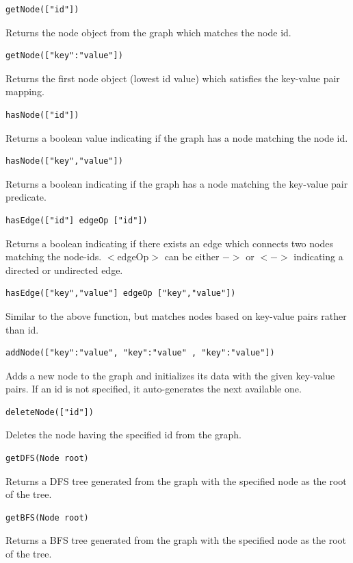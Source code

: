 \documentclass[a4paper]{article}
\begin{document}
\begin{verbatim}getNode(["id"])\end{verbatim} Returns the node object from the graph which matches the node id.
\newline
\begin{verbatim}getNode(["key":"value"])\end{verbatim} Returns the first node object (lowest id value) which satisfies the key-value pair mapping.
\newline
\begin{verbatim}hasNode(["id"])\end{verbatim} Returns a boolean value indicating if the graph has a node matching the node id.
\newline
\begin{verbatim}hasNode(["key","value"])\end{verbatim} Returns a boolean indicating if the graph has a node matching the key-value pair predicate.
\newline
\begin{verbatim}hasEdge(["id"] edgeOp ["id"])\end{verbatim} Returns a boolean indicating if there exists an edge which connects two nodes matching the node-ids. $<$edgeOp$>$ can be either $->$ or $<->$ indicating a directed or undirected edge.
\newline
\begin{verbatim}hasEdge(["key","value"] edgeOp ["key","value"])\end{verbatim} Similar to the above function, but matches nodes based on key-value pairs rather than id.
\newline
\begin{verbatim}addNode(["key":"value", "key":"value" , "key":"value"])\end{verbatim} Adds a new node to the graph and initializes its data with the given key-value pairs. If an id is not specified, it auto-generates the next available one.
\newline
\begin{verbatim}deleteNode(["id"])\end{verbatim} Deletes the node having the specified id from the graph.
\newline
\begin{verbatim}getDFS(Node root)\end{verbatim} Returns a DFS tree generated from the graph with the specified node as the root of the tree.
\newline
\begin{verbatim}getBFS(Node root)\end{verbatim} Returns a BFS tree generated from the graph with the specified node as the root of the tree.
\end{document}
